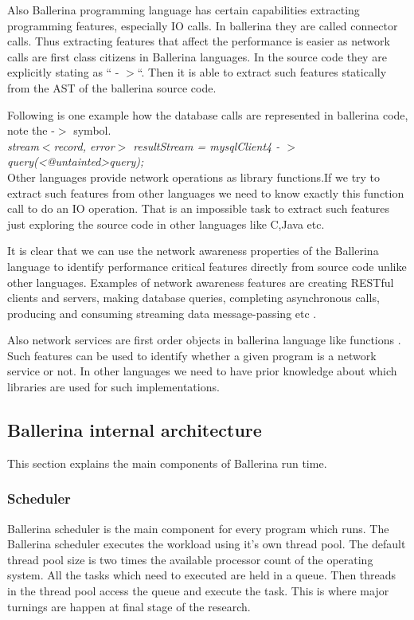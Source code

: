 Also Ballerina programming language has certain capabilities extracting programming features, especially IO calls. In ballerina they are called connector calls. Thus extracting features that affect the performance is easier as network calls are first class citizens in Ballerina languages. In the source code they are explicitly stating as “ - $>$“. Then it is able to extract such features statically from the \acrfull{AST} of the ballerina source code.


Following is one example how the database calls are represented in ballerina code, note the -$>$ symbol.\\

\textit{stream$<$record{}, error$>$ resultStream = mysqlClient4 - $>$ query(<@untainted>query);}\\


Other languages provide network operations as library functions.If we try to extract such features from other languages we need to know exactly this function call to do an IO operation. That is an impossible task to extract such features just exploring the source code in other languages like C,Java etc.


It is clear that we can use the network awareness properties  of the Ballerina language to identify performance critical features directly from source code unlike other languages. Examples of network awareness features are creating RESTful clients and servers, making database queries, completing asynchronous calls, producing and consuming streaming data message-passing etc \cite{ballerina_book}.

Also network services are first order objects in ballerina language like functions \cite{ballerina_book}. Such features can be used to identify whether a given program is a network service or not. In other languages we need to have prior knowledge about which libraries are used for such implementations.


\subsection{Ballerina internal architecture}

This section explains the main components of Ballerina run time.

\subsubsection{Scheduler}

Ballerina scheduler is the main component for every program which runs. The Ballerina scheduler executes the workload using it’s own thread pool. The default thread pool size is two times the available processor count of the operating system. All the tasks which need to executed are held in a queue. Then threads in the thread pool access the queue and execute the task. This is where major turnings are happen at final stage of the research. 

